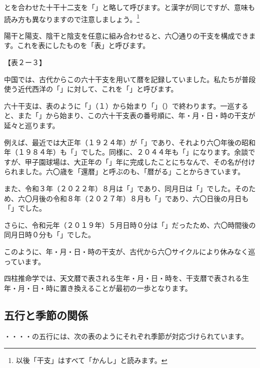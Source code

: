 \documentclass[a4paper,11pt,twocolumn,dvipdfmx]{tarticle}
\begin{document}
とを合わせた十干十二支を「」と略して呼びます。と漢字が同じですが、意味も読み方も異なりますので注意しましょう。\footnote{以後「干支」はすべて「かんし」と読みます。}

陽干と陽支、陰干と陰支を任意に組み合わせると、六〇通りの干支を構成できます。これを表にしたものを「表」と呼びます。

【表２ー３】

中国では、古代からこの六十干支を用いて暦を記録していました。私たちが普段使う近代西洋の「」に対して、これを「」と呼びます。

六十干支は、表のように「」（１）から始まり「」（）で終わります。一巡すると、また「」から始まり、この六十干支表の番号順に、年・月・日・時の干支が延々と巡ります。

例えば、最近では大正年（１９２４年）が「」であり、それより六〇年後の昭和年（１９８４年）も「」でした。同様に、２０４４年も「」になります。余談ですが、甲子園球場は、大正年の「」年に完成したことにちなんで、その名が付けられました。六〇歳を「還暦」と呼ぶのも、「暦がる」ことからきています。

また、令和３年（２０２２年）８月は「」であり、同月日は「」でした。そのため、六〇月後の令和８年（２０２７年）８月も「」であり、六〇日後の月日も「」でした。

さらに、令和元年（２０１９年）５月日時０分は「」だったため、六〇時間後の同月日時０分も「」でした。

このように、年・月・日・時の干支が、古代から六〇サイクルにより休みなく巡っています。

四柱推命学では、天文暦で表される生年・月・日・時を、干支暦で表される生年・月・日・時に置き換えることが最初の一歩となります。


\subsection{五行と季節の関係}

・・・・の五行には、次の表のようにそれぞれ季節が対応づけられています。
\end{document}
